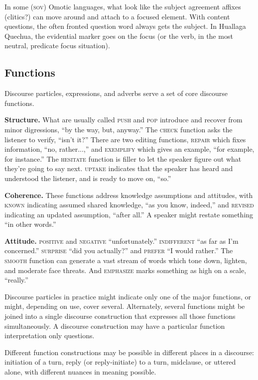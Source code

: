 \documentclass[11pt]{article}
\newcommand{\I}[1]{\textsc{#1}}   %
\begin{document}
{In some (\I{sov}) Omotic languages, what look like the subject
agreement affixes (clitics?) can move around and attach to a focused
element.  With content questions, the often fronted question word
always gets the subject.  In Huallaga Quechua, the evidential marker
goes on the focus (or the verb, in the most neutral, predicate focus
situation).

\subsection{Functions} Discourse particles, expressions, and adverbs
serve a set of core discourse functions.

\textbf{Structure.} What are usually called \I{push} and \I{pop}
introduce and recover from minor digressions, ``by the way, but,
anyway.''  The \I{check} function asks the listener to verify, ``isn't
it?''  There are two editing functions, \I{repair} which fixes
information, ``no, rather...,'' and \I{exemplify} which gives an
example, ``for example, for instance.''  The \I{hesitate} function is
filler to let the speaker figure out what they're going to say next.
\I{uptake} indicates that the speaker has heard and understood the
listener, and is ready to move on, ``so.''

\textbf{Coherence.} These functions address knowledge assumptions and
attitudes, with \I{known} indicating assumed shared knowledge, ``as
you know, indeed,'' and \I{revised} indicating an updated assumption,
``after all.''  A speaker might restate something ``in other words.''

\textbf{Attitude.} \I{positive} and \I{negative} ``unfortunately.''
\I{indifferent} ``as far as I'm concerned.''  \I{surprise} ``did you
actually?'' and \I{prefer} ``I would rather.''  The \I{smooth}
function can generate a vast stream of words which tone down, lighten,
and moderate face threats.  And \I{emphasize} marks something as high
on a scale, ``really.''

Discourse particles in practice might indicate only one of the major
functions, or might, depending on use, cover several.  Alternately,
several functions might be joined into a single discourse construction
that expresses all those functions simultaneously.  A discourse
construction may have a particular function interpretation only
questions.

Different function constructions may be possible in different places
in a discourse: initiation of a turn, reply (or reply-initiate) to a
turn, midclause, or uttered alone, with different nuances in meaning
possible. 

}
\end{document}
